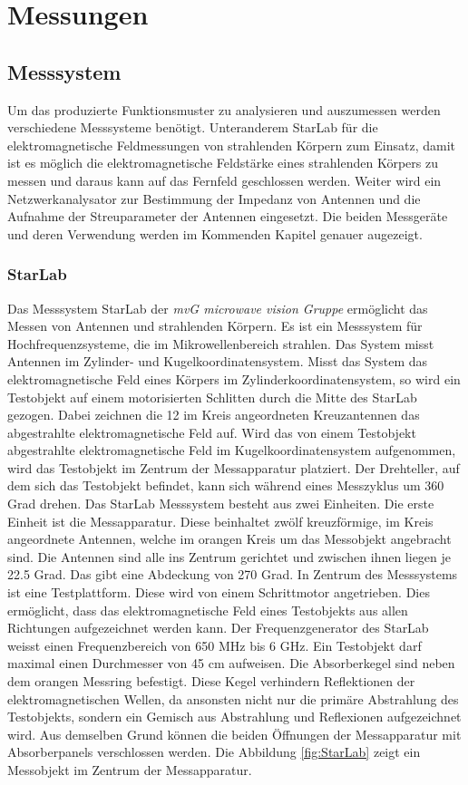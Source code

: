\newpage
\chapter{Messungen}
\section{Messsystem}
Um das produzierte Funktionsmuster zu analysieren und auszumessen werden verschiedene Messsysteme benötigt. Unteranderem StarLab für die elektromagnetische Feldmessungen von strahlenden Körpern zum Einsatz, damit ist es möglich die elektromagnetische Feldstärke eines strahlenden Körpers zu messen und daraus kann auf das Fernfeld geschlossen werden. Weiter wird ein Netzwerkanalysator zur Bestimmung der Impedanz von Antennen und die Aufnahme der Streuparameter der Antennen eingesetzt. Die beiden Messgeräte und deren Verwendung werden im Kommenden Kapitel genauer augezeigt.\\

\subsection{StarLab}
Das Messsystem  StarLab der \textit{mvG microwave vision Gruppe} ermöglicht das Messen von Antennen und strahlenden Körpern. Es ist ein Messsystem für Hochfrequenzsysteme, die im Mikrowellenbereich strahlen. Das System misst Antennen im Zylinder- und Kugelkoordinatensystem. Misst das System das elektromagnetische Feld eines Körpers im Zylinderkoordinatensystem, so wird ein Testobjekt auf einem motorisierten Schlitten durch die Mitte des StarLab gezogen. Dabei zeichnen die 12 im Kreis angeordneten Kreuzantennen das abgestrahlte elektromagnetische Feld auf. 
Wird das von einem Testobjekt abgestrahlte elektromagnetische Feld im Kugelkoordinatensystem aufgenommen, wird das Testobjekt im Zentrum der Messapparatur platziert. Der Drehteller, auf dem sich das Testobjekt befindet, kann sich während eines Messzyklus um 360 Grad drehen. 
Das StarLab Messsystem besteht aus  zwei Einheiten. Die erste Einheit ist die Messapparatur. Diese beinhaltet zwölf kreuzförmige, im Kreis angeordnete Antennen, welche im orangen Kreis um das Messobjekt angebracht sind.  Die Antennen sind alle ins Zentrum gerichtet und zwischen ihnen liegen je 22.5 Grad. Das gibt eine Abdeckung von 270 Grad. In Zentrum des Messsystems ist eine Testplattform. Diese wird von einem Schrittmotor angetrieben. Dies ermöglicht, dass das elektromagnetische Feld eines Testobjekts aus allen Richtungen aufgezeichnet werden kann. Der Frequenzgenerator des StarLab weisst einen Frequenzbereich von 650 MHz bis 6 GHz. Ein Testobjekt darf maximal einen Durchmesser von 45 cm aufweisen.
Die Absorberkegel sind neben dem orangen Messring befestigt. Diese Kegel verhindern Reflektionen der elektromagnetischen Wellen, da ansonsten nicht nur die primäre Abstrahlung des Testobjekts, sondern ein Gemisch aus Abstrahlung und Reflexionen aufgezeichnet wird. Aus demselben Grund können die beiden Öffnungen der Messapparatur mit Absorberpanels verschlossen werden. Die Abbildung \ref{fig:StarLab} zeigt ein Messobjekt im Zentrum der Messapparatur. 

